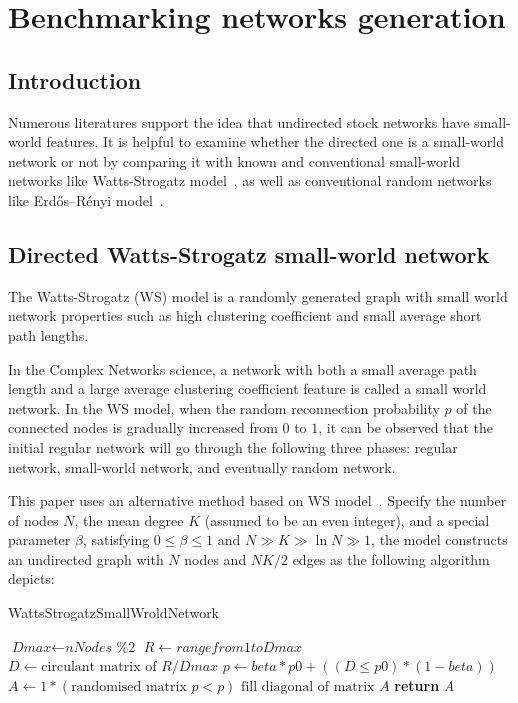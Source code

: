 \chapter{Benchmarking networks generation}
\section{Introduction}
Numerous literatures support the idea that undirected stock networks have small-world features. It is helpful to examine whether the directed one is a small-world network or not by comparing it with known and conventional small-world networks like Watts-Strogatz model~\cite{watts1998collective}, as well as conventional random networks like Erdős–Rényi model~\cite{random}.

\section{Directed Watts-Strogatz small-world network}
The Watts-Strogatz (WS) model is a randomly generated graph with small world network properties such as high clustering coefficient and small average short path lengths.

In the Complex Networks science, a network with both a small average path length and a large average clustering coefficient feature is called a small world network. In the WS model, when the random reconnection probability $p$ of the connected nodes is gradually increased from $0$ to $1$, it can be observed that the initial regular network will go through the following three phases: regular network, small-world network, and eventually random network.

This paper uses an alternative method based on WS model~\cite{song2014simple}. Specify the number of nodes $N$, the mean degree $K$ (assumed to be an even integer), and a special parameter $\beta$, satisfying $0\leq \beta \leq 1$ and $N\gg K\gg \ln N\gg 1$, the model constructs an undirected graph with $N$ nodes and ${NK}/{2}$ edges as the following algorithm depicts:

\begin{algorithm}[H]
	\caption{WattsStrogatzSmallWroldNetwork}\label{alg:smallworld}
	\begin{algorithmic}[1]
		\State $\textit{Dmax} \gets \textit{nNodes \% 2}$
		\State $\textit{R} \gets range from 1 to \textit{Dmax}$
		\State $\textit{D} \gets \text{circulant matrix of } \textit{R}/\textit{Dmax}$
		\State $\textit{p} \gets \textit{beta}*\textit{p0}+((\textit{D} \leq \textit{p0})*(1-\textit{beta}))$
		\State $\textit{A} \gets 1*(\text{randomised matrix }\textit{p} < p)$
		\State $\text{fill diagonal of matrix }\textit{A}$
		\State \textbf{return} {\textit{A}}
		\EndProcedure
	\end{algorithmic}
\end{algorithm}

